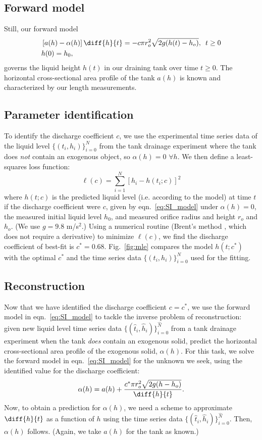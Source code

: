 \documentclass[a4paper,fleqn]{cas-sc}
\begin{document}
 \subsection{Forward model} Still, our forward model
\begin{align}
& \left[ a(h)-\alpha(h)\right] \diff{h}{t}= -c \pi r_o^2 \sqrt{2g (h(t)-h_o)}, \,\,\, t \geq 0\label{eq:SI_model} \\
& h(0)=h_0, \nonumber 
\end{align}
 governs the liquid height $h(t)$ in our draining tank over time $t \geq 0$.
 The horizontal cross-sectional area profile of the tank $a(h)$ is known and characterized by our length measurements.
 
 \subsection{Parameter identification}
 To identify the discharge coefficient $c$, we use the experimental time series data of the liquid level $\{(t_i, h_i)\}_{i=0}^N$ from the tank drainage experiment where the tank does \emph{not} contain an exogenous object, so $\alpha(h) = 0$ $\forall h$. We then define a least-squares loss function:
 \begin{equation}
 	\ell(c) = \displaystyle\sum_{i=1}^N [h_i - h(t_i; c)]^2
 \end{equation} where $h(t;c)$ is the predicted liquid level (i.e. according to the model) at time $t$ if the discharge coefficient were $c$, given by eqn.~\ref{eq:SI_model} under $\alpha(h)=0$, the measured initial liquid level $h_0$, and measured orifice radius and height $r_o$ and $h_o$. (We use $g=9.8$ m/s$^2$.)
 Using a numerical routine (Brent's method \cite{brent2013algorithms}, which does not require a derivative) to minimize $\ell(c)$, we find the discharge coefficient of best-fit is $c^*=0.68$. Fig.~\ref{fig:mle} compares the model $h(t;c^*)$ with the optimal $c^*$ and the time series data $\{(t_i, h_i)\}_{i=0}^N$ used for the fitting.
 
 \subsection{Reconstruction}
Now that we have identified the discharge coefficient $c=c^*$, we use the forward model in eqn.~\ref{eq:SI_model} to tackle the inverse problem of reconstruction: given new liquid level time series data $\{(\hat{t}_i, \hat{h}_i)\}_{i=0}^{\hat{N}}$ from a tank drainage experiment when the tank \emph{does} contain an exogenous solid, predict the horizontal cross-sectional area profile of the exogenous solid, $\alpha(h)$. For this task, we solve the forward model in eqn.~\ref{eq:SI_model} for the unknown we seek, using the identified value for the discharge coefficient:
\begin{equation}
\alpha(h) = a(h) +  \frac{c^* \pi r_o^2 \sqrt{2g (h-h_o)}}{\diff{h}{t}}. \label{eq:alpha_unknown}
\end{equation} 
Now, to obtain a prediction for $\alpha(h)$, we need a scheme to approximate $\diff{h}{t}$ as a function of $h$ using the time series data $\{(\hat{t}_i, \hat{h}_i)\}_{i=0}^{\hat{N}}$. Then, $\alpha(h)$ follows. (Again, we take $a(h)$ for the tank as known.)
\end{document}
